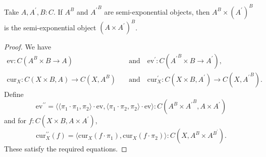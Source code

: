 \begin{lemma}
  Take $ A, A^\prime, B : C $. If $ A^B $ and $ {A^\prime}^B $ are semi-exponential objects, then $ A^B \times (A^\prime)^B $ is the semi-exponential object $ (A \times A^\prime)^B $.
\end{lemma}
\begin{proof}
  We have
  \begin{align*}
    \mathrm{ev} : C(A^B \times B \to A) \quad &\text{and} \quad \mathrm{ev}^\prime : C({A^\prime}^B \times B \to A^\prime),\\
    \mathrm{cur}_X: C(X \times B, A) \to C(X, A^B) \quad &\text{and} \quad \mathrm{cur}^\prime_X: C(X \times B, A^\prime) \to C(X, {A^\prime}^B).
  \end{align*}
  Define
  \[ \mathrm{ev}^{\prime \prime} = \langle \langle \pi_1 \cdot \pi_1, \pi_2 \rangle \cdot \mathrm{ev}, \langle \pi_1 \cdot \pi_2, \pi_2 \rangle \cdot \mathrm{ev} \rangle : C(A^B \times {A^\prime}^B, A \times A^\prime) \]
  and for $ f: C(X \times B, A \times A^\prime) $,
  \[ \mathrm{cur}^{\prime \prime}_X(f) = \langle \mathrm{cur}_X(f \cdot \pi_1), \mathrm{cur}_X(f \cdot \pi_2) \rangle : C(X, A^B \times A^{B^\prime}). \]
  These satisfy the required equations.
\end{proof}

